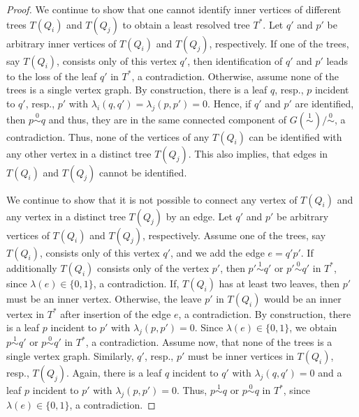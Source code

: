 \documentclass[smallextended]{svjour3}
\newcommand{\Ro}{\mathrel{\overset{0}{\sim}}}
\newcommand{\Rl}{\mathrel{\overset{1}{\sim}}}
\begin{document}
\begin{proof}
{  We continue to show that one cannot identify inner vertices of different
  trees $T(Q_i)$ and $T(Q_j)$ to obtain a least resolved tree $T^*$.  
  Let $q'$ and $p'$ be
  arbitrary inner vertices of $T(Q_i)$ and $T(Q_j)$, respectively. If one
  of the trees, say $T(Q_i)$, consists only of this vertex $q'$, then
  identification of $q'$ and $p'$ leads to the loss of the leaf $q'$ in
  $T^*$, a contradiction.  Otherwise, assume none of the trees is a single
  vertex graph.  By construction, there is a leaf $q$, resp., $p$ incident
  to $q'$, resp., $p'$ with $\lambda_i(q,q')=\lambda_j(p,p')=0$.  Hence, if
  $q'$ and $p'$ are identified, then $p\Ro q$ and thus, they are in the
  same connected component of $G(\Rl)/\Ro$, a contradiction.  Thus, none of
  the vertices of any $T(Q_i)$ can be identified with any other vertex in a
  distinct tree $T(Q_j)$.  This also implies, that edges in $T(Q_i)$ and
  $T(Q_j)$ cannot be identified.

  We continue to show that it is not possible to connect any vertex of
  $T(Q_i)$ and any vertex in a distinct tree $T(Q_j)$ by an edge.  Let $q'$
  and $p'$ be arbitrary vertices of $T(Q_i)$ and $T(Q_j)$,
  respectively. Assume one of the trees, say $T(Q_i)$, consists only of
  this vertex $q'$, and we add the edge $e=q'p'$.  If additionally $T(Q_i)$
  consists only of the vertex $p'$, then $p'\Rl q'$ or $p'\Ro q'$ in $T^*$,
  since $\lambda(e)\in \{0,1\}$, a contradiction.  If, $T(Q_i)$ has at
  least two leaves, then $p'$ must be an inner vertex. Otherwise, the leave
  $p'$ in $T(Q_i)$ would be an inner vertex in $T^*$ after insertion of the
  edge $e$, a contradiction.  By construction, there is a leaf $p$
  incident to $p'$ with $\lambda_j(p,p')=0$. Since $\lambda(e)\in \{0,1\}$,
  we obtain $p\Rl q'$ or $p\Ro q'$ in $T^*$, a contradiction.  Assume now,
  that none of the trees is a single vertex graph.  Similarly, $q'$, resp.,
  $p'$ must be inner vertices in $T(Q_i)$, resp., $T(Q_j)$.  Again, there
  is a leaf $q$ incident to $q'$ with $\lambda_j(q,q')=0$ and a leaf $p$
  incident to $p'$ with $\lambda_j(p,p')=0$.  Thus, $p\Rl q$ or $p\Ro q$ in
  $T^*$, since $\lambda(e)\in \{0,1\}$, a contradiction.

}
\end{proof}
\end{document}
